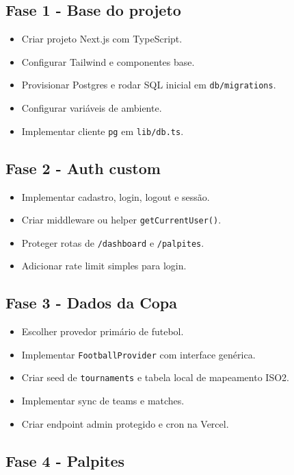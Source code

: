 \documentclass[12pt,a4paper]{article}
\begin{document}
\subsection{Fase 1 - Base do projeto}

\begin{itemize}
  \item Criar projeto Next.js com TypeScript.
  \item Configurar Tailwind e componentes base.
  \item Provisionar Postgres e rodar SQL inicial em \texttt{db/migrations}.
  \item Configurar variáveis de ambiente.
  \item Implementar cliente \texttt{pg} em \texttt{lib/db.ts}.
\end{itemize}

\subsection{Fase 2 - Auth custom}

\begin{itemize}
  \item Implementar cadastro, login, logout e sessão.
  \item Criar middleware ou helper \texttt{getCurrentUser()}.
  \item Proteger rotas de \texttt{/dashboard} e \texttt{/palpites}.
  \item Adicionar rate limit simples para login.
\end{itemize}

\subsection{Fase 3 - Dados da Copa}

\begin{itemize}
  \item Escolher provedor primário de futebol.
  \item Implementar \texttt{FootballProvider} com interface genérica.
  \item Criar seed de \texttt{tournaments} e tabela local de mapeamento ISO2.
  \item Implementar sync de teams e matches.
  \item Criar endpoint admin protegido e cron na Vercel.
\end{itemize}

\subsection{Fase 4 - Palpites}
\end{document}
